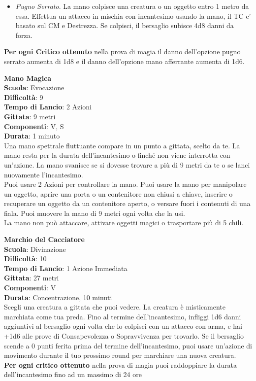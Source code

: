 \begin{multicols}{2}
\begin{itemize}
\item
\textit{Pugno Serrato}. La mano colpisce una creatura o un oggetto entro 1 metro da essa. Effettua un attacco in mischia con incantesimo usando la mano, il TC e' basato sul CM e Destrezza. Se colpisci, il bersaglio subisce 4d8 danni da forza.
\end{itemize}
\medskip
\textbf{Per ogni Critico ottenuto} nella prova di magia il danno dell'opzione pugno serrato aumenta di 1d8 e il danno dell'opzione mano afferrante aumenta di 1d6.

\medskip\textbf{Mano Magica}\\
\textbf{Scuola}: Evocazione\\
\textbf{Difficoltà}:  9\\
\textbf{Tempo di Lancio}: 2 Azioni\\
\textbf{Gittata}: 9 metri\\
\textbf{Componenti}: V, S\\
\textbf{Durata}: 1 minuto\\
Una mano spettrale fluttuante compare in un punto a gittata, scelto da te. La mano resta per la durata dell'incantesimo o finché non viene interrotta con un'azione. La mano svanisce se si dovesse trovare a più di 9 metri da te o se lanci nuovamente l'incantesimo.\\
Puoi usare 2 Azioni per controllare la mano. Puoi usare la mano per manipolare un oggetto, aprire una porta o un contenitore non chiusi a chiave, inserire o recuperare un oggetto da un contenitore aperto, o versare fuori i contenuti di una fiala. Puoi muovere la mano di 9 metri ogni volta che la usi.\\
La mano non può attaccare, attivare oggetti magici o trasportare più di 5 chili.

\medskip\textbf{Marchio del Cacciatore}\\
\textbf{Scuola}: Divinazione\\
\textbf{Difficoltà}:  10\\
\textbf{Tempo di Lancio}: 1 Azione Immediata\\
\textbf{Gittata}: 27 metri\\
\textbf{Componenti}: V\\
\textbf{Durata}: Concentrazione, 10 minuti\\
Scegli una creatura a gittata che puoi vedere. La creatura è misticamente marchiata come tua preda. Fino al termine dell'incantesimo, infliggi 1d6 danni aggiuntivi al bersaglio ogni volta che lo colpisci con un attacco con arma, e hai +1d6 alle prove di Consapevolezza o Sopravvivenza per trovarlo. Se il bersaglio scende a 0 punti ferita prima del termine dell'incantesimo, puoi usare un'azione di movimento durante il tuo prossimo round per marchiare una nuova creatura.\\
\textbf{Per ogni critico ottenuto} nella prova di magia puoi raddoppiare la durata dell'incantesimo fino ad un massimo di 24 ore


\end{multicols}
